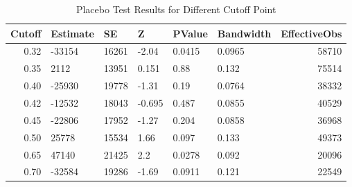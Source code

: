 \begin{table}[ht]
\centering
\begin{tabular}{rlllllr}
  \hline
Cutoff & Estimate & SE & Z & PValue & Bandwidth & EffectiveObs \\ 
  \hline
0.32 & -33154 & 16261 & -2.04 & 0.0415 & 0.0965 & 58710 \\ 
  0.35 & 2112 & 13951 & 0.151 & 0.88 & 0.132 & 75514 \\ 
  0.40 & -25930 & 19778 & -1.31 & 0.19 & 0.0764 & 38332 \\ 
  0.42 & -12532 & 18043 & -0.695 & 0.487 & 0.0855 & 40529 \\ 
  0.45 & -22806 & 17952 & -1.27 & 0.204 & 0.0858 & 36968 \\ 
  0.50 & 25778 & 15534 & 1.66 & 0.097 & 0.133 & 49373 \\ 
  0.65 & 47140 & 21425 & 2.2 & 0.0278 & 0.092 & 20096 \\ 
  0.70 & -32584 & 19286 & -1.69 & 0.0911 & 0.121 & 22549 \\ 
   \hline
\end{tabular}
\caption{Placebo Test Results for Different Cutoff Point} 
\label{tab:movement_cutoff}
\end{table}

